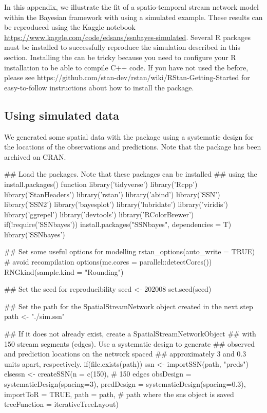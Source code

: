 In this appendix, we illustrate the fit of a spatio-temporal stream network model within the Bayesian framework with  using a simulated example. These results can be reproduced using the Kaggle notebook \url{https://www.kaggle.com/code/edsans/ssnbayes-simulated}. Several R packages must be installed to successfully reproduce the simulation described in this section. Installing the  can be tricky because you need to configure your R installation to be able to compile C++ code. If you have not used the  before, please see https://github.com/stan-dev/rstan/wiki/RStan-Getting-Started for easy-to-follow instructions about how to install the package.




\subsection*{Using simulated data}


We generated some spatial data with the  package using a systematic design for the locations of the observations and predictions. Note that the  package has been archived on CRAN. 

\begin{example}
## Load the packages. Note that these packages can be installed 
## using the install.packages() function
library('tidyverse')
library('Rcpp')
library('StanHeaders')
library('rstan')
library('abind')
library('SSN')
library('SSN2')
library('bayesplot')
library('lubridate')
library('viridis')
library('ggrepel')
library('devtools')
library('RColorBrewer')
if(!require('SSNbayes')) install.packages("SSNbayes", dependencies = T)
library('SSNbayes')
\end{example}


\begin{example}
## Set some useful options for modelling
rstan_options(auto_write = TRUE) # avoid recompilation
options(mc.cores = parallel::detectCores())
RNGkind(sample.kind = "Rounding")

## Set the seed for reproducibility
seed <- 202008
set.seed(seed)

## Set the path for the SpatialStreamNetwork object created in the next step
path <- "./sim.ssn"

## If it does not already exist, create a SpatialStreamNetworkObject
## with 150 stream segments (edges). Use a systematic design to generate
## observed and prediction locations on the network spaced
## approximately 3 and 0.3 units apart, respectively.
if(file.exists(path)){
  ssn <- importSSN(path, "preds")
}  else{ssn <- createSSN(n = c(150),  # 150 edges
               obsDesign = systematicDesign(spacing=3),
               predDesign = systematicDesign(spacing=0.3),
               importToR = TRUE,
               path = path, # path where the sns object is saved
               treeFunction = iterativeTreeLayout)}
\end{example}

